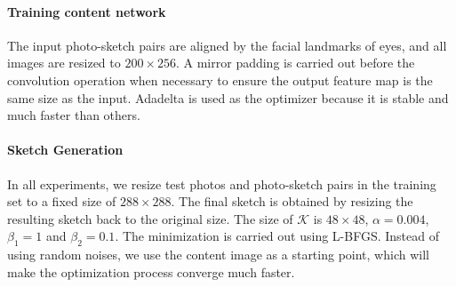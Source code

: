 \documentclass[10pt,twocolumn,letterpaper]{article}
\begin{document}
\paragraph{Training content network} The input photo-sketch pairs are aligned by the facial landmarks of eyes, and all images are resized to $200\times256$. A mirror padding is carried out before the convolution operation when necessary to ensure the output feature map is the same size as the input. Adadelta \cite{matt2012adadelta} is used as the optimizer because it is stable and much faster than others.  

\paragraph{Sketch Generation} 
In all experiments, we resize test photos and photo-sketch pairs in the training set to a fixed size of $288\times288$. The final sketch is obtained by resizing the resulting sketch back to the original size. The size of $\mathcal{K}$ is $48\times48$, $\alpha=0.004$, $\beta_1=1$ and $\beta_2=0.1$. The minimization is carried out using L-BFGS. Instead of using random noises, we use the content image as a starting point, which will make the optimization process converge much faster. 

\end{document}
